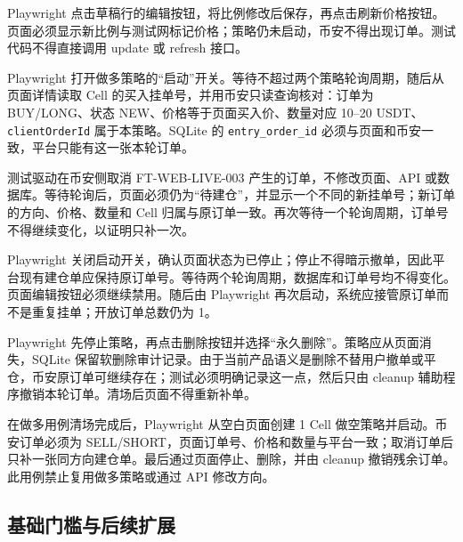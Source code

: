 Playwright 点击草稿行的编辑按钮，将比例修改后保存，再点击刷新价格按钮。页面必须显示新比例与测试网标记价格；策略仍未启动，币安不得出现订单。测试代码不得直接调用 update 或 refresh 接口。


Playwright 打开做多策略的“启动”开关。等待不超过两个策略轮询周期，随后从页面详情读取 Cell 的买入挂单号，并用币安只读查询核对：订单为 BUY/LONG、状态 NEW、价格等于页面买入价、数量对应 10--20 USDT、\texttt{clientOrderId} 属于本策略。SQLite 的 \texttt{entry\_order\_id} 必须与页面和币安一致，平台只能有这一张本轮订单。


测试驱动在币安侧取消 FT-WEB-LIVE-003 产生的订单，不修改页面、API 或数据库。等待轮询后，页面必须仍为“待建仓”，并显示一个不同的新挂单号；新订单的方向、价格、数量和 Cell 归属与原订单一致。再次等待一个轮询周期，订单号不得继续变化，以证明只补一次。


Playwright 关闭启动开关，确认页面状态为已停止；停止不得暗示撤单，因此平台现有建仓单应保持原订单号。等待两个轮询周期，数据库和订单号均不得变化。页面编辑按钮必须继续禁用。随后由 Playwright 再次启动，系统应接管原订单而不是重复挂单；开放订单总数仍为 1。


Playwright 先停止策略，再点击删除按钮并选择“永久删除”。策略应从页面消失，SQLite 保留软删除审计记录。由于当前产品语义是删除不替用户撤单或平仓，币安原订单可继续存在；测试必须明确记录这一点，然后只由 cleanup 辅助程序撤销本轮订单。清场后页面不得重新补单。


在做多用例清场完成后，Playwright 从空白页面创建 1 Cell 做空策略并启动。币安订单必须为 SELL/SHORT，页面订单号、价格和数量与平台一致；取消订单后只补一张同方向建仓单。最后通过页面停止、删除，并由 cleanup 撤销残余订单。此用例禁止复用做多策略或通过 API 修改方向。

\subsection{基础门槛与后续扩展}

